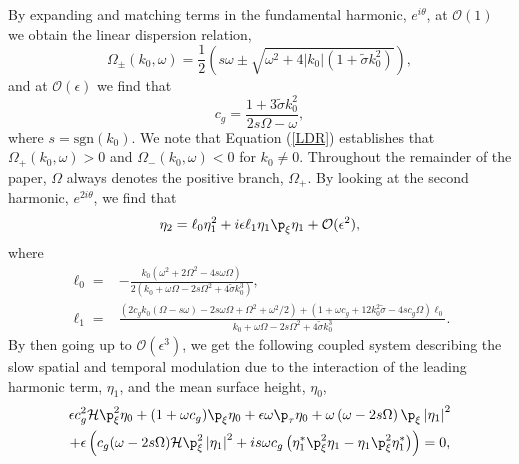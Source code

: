 \documentclass{JFM_Style/jfm}
\begin{document}
By expanding and matching terms in the fundamental harmonic, $e^{i\theta}$, at $\mathcal{O}(1)$ we obtain the linear dispersion relation,
\begin{equation}
\Omega_{\pm}(k_{0},\omega)  = \frac{1}{2}\left(s\omega \pm \sqrt{\omega^{2} + 4|k_{0}|(1+\tilde{\sigma}k_{0}^{2})}\right),
\label{LDR}
\end{equation}
and at $\mathcal{O}(\epsilon)$ we find that
\[
c_{g} = \frac{1+3\tilde{\sigma}k_{0}^{2}}{2s\Omega - \omega},
\]
where $s=\mbox{sgn}(k_{0})$.  We note that Equation (\ref{LDR}) establishes that $\Omega_{+}(k_{0},\omega) > 0$ and $\Omega_{-}(k_{0},\omega) < 0$ for $k_{0}\neq0$.  Throughout the remainder of the paper, $\Omega$ always denotes the positive branch, $\Omega_{+}$.  By looking at the second harmonic, $e^{2i\theta}$, we find that
\[
\eta_{2} = \ell_{0}\eta_{1}^{2} + i\epsilon\ell_{1}\eta_{1}\p_{\xi}\eta_{1}+\mathcal{O}(\epsilon^2),
\]
where
\begin{align*}
\ell_{0} = & -\frac{k_{0}\left(\omega^{2}+2\Omega^{2}-4s\omega\Omega\right)}{2(k_{0} + \omega\Omega - 2s\Omega^{2} + 4\tilde{\sigma}k_{0}^{3})},\\
\ell_{1} = & \frac{\left(2c_{g}k_{0}(\Omega-s\omega)-2s\omega\Omega + \Omega^{2} + \omega^{2}/2\right)+(1+\omega c_{g} + 12k_{0}^{2}\tilde{\sigma}-4sc_{g} \Omega)\ell_{0}}{k_{0} + \omega\Omega - 2s\Omega^{2} + 4\tilde{\sigma}k_{0}^{3}}.
\end{align*}
By then going up to $\mathcal{O}(\epsilon^{3})$, we get the following coupled system describing the slow spatial and temporal modulation due to the interaction of the leading harmonic term, $\eta_{1}$, and the mean surface height, $\eta_{0}$,
\begin{multline}
\epsilon c_{g}^{2}\mathcal{H}\p_{\xi}^{2}\eta_{0} + (1+\omega c_{g})\p_{\xi}\eta_{0} + \epsilon \omega \p_{\tau} \eta_{0} + \omega\left(\omega-2s\Omega\right)\p_{\xi}\left|\eta_{1}\right|^{2}\\
+\epsilon\left(c_{g}(\omega-2s\Omega)\mathcal{H}\p_{\xi}^{2}\left|\eta_{1}\right|^{2} + is\omega c_{g}\left(\eta_{1}^{\ast}\p_{\xi}^{2}\eta_{1}-\eta_{1}\p_{\xi}^{2}\eta_{1}^{\ast}\right) \right) = 0,
\label{zaveq}
\end{multline}
\end{document}
